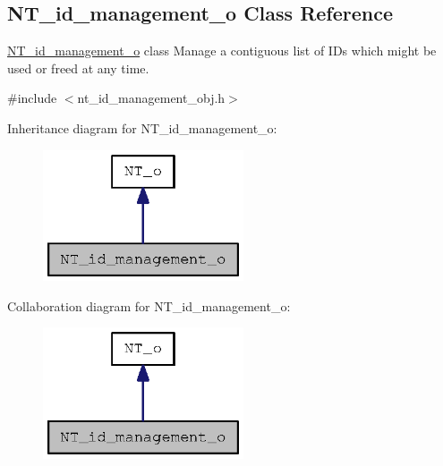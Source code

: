 \subsection{NT\_\-id\_\-management\_\-o Class Reference}
\label{class_n_t__id__management__o}


\hyperlink{class_n_t__id__management__o}{NT\_\-id\_\-management\_\-o} class Manage a contiguous list of IDs which might be used or freed at any time.  




{\ttfamily \#include $<$nt\_\-id\_\-management\_\-obj.h$>$}



Inheritance diagram for NT\_\-id\_\-management\_\-o:
\nopagebreak
\begin{figure}[H]
\begin{center}
\leavevmode
\includegraphics[width=168pt]{class_n_t__id__management__o__inherit__graph}
\end{center}
\end{figure}


Collaboration diagram for NT\_\-id\_\-management\_\-o:
\nopagebreak
\begin{figure}[H]
\begin{center}
\leavevmode
\includegraphics[width=168pt]{class_n_t__id__management__o__coll__graph}
\end{center}
\end{figure}
